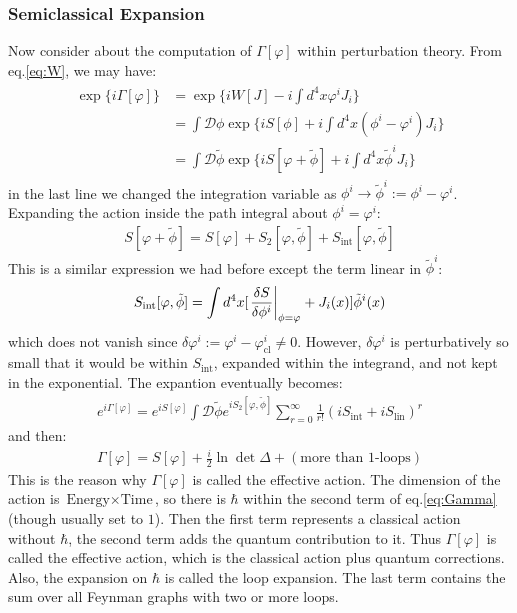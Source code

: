 \subsubsection{Semiclassical Expansion}
Now consider about the computation of $\Gamma[\varphi]$ within perturbation theory. From eq.\ref{eq:W}, we may have:
\begin{align}
    \begin{split}
        \exp \lbrace i\Gamma[\varphi]\rbrace &= \exp \lbrace iW[J] - i\int d^{4}x \varphi^{i} J_{i} \rbrace \\
        &= \int \mathcal{D} \phi \exp \lbrace iS[\phi] + i \int d^{4}x (\phi ^{i} - \varphi ^{i})J_{i} \rbrace \\
        &= \int \mathcal{D} \tilde{\phi} \exp \lbrace iS[\varphi + \tilde{\phi}]+ i\int d^{4}x \tilde{\phi} ^{i} J_{i} \rbrace
    \end{split}
\end{align}
in the last line we changed the integration variable as $\phi ^{i} \rightarrow \tilde{\phi}^{i} := \phi ^{i} - \varphi ^{i}$. Expanding the action inside the path integral about $\phi^{i} = \varphi ^{i}$:
\begin{align}
    S[\varphi + \tilde{\phi}] = S[\varphi] + S_{2} [\varphi, \tilde{\phi}] + S_{\text{int}}[\varphi,\tilde{\phi}]
\end{align}
This is a similar expression we had before except the term linear in $\tilde{\phi}^{i}$:
\begin{align}
    S_{\text{int}}[\varphi,\tilde{\phi}] = \int d^{4}x [\eval{\fdv{S}{\phi^{i}}(x)}_{\phi=\varphi} + J_{i}(x)] \tilde{\phi}^{i}(x)
\end{align}
which does not vanish since $\delta \varphi^{i} := \varphi ^{i} - \varphi_{\text{cl}}^{i} \neq 0$. However, $\delta\varphi^{i}$ is perturbatively so small that it would be within $S_{\text{int}}$, expanded within the integrand, and not kept in the exponential. The expantion eventually becomes:
\begin{align}
    e^{i\Gamma[\varphi]} = e^{iS[\varphi]} \int \mathcal{D}\tilde{\phi} e^{iS_{2}[\varphi,\tilde{\phi}]}\sum _{r=0}^{\infty} \frac{1}{r!}(iS_{\text{int}}+ i S_{\text{lin}})^{r}
\end{align}
and then:
\begin{align}
    \label{eq:Gamma}
    \Gamma[\varphi] = S[\varphi] + \frac{i}{2}\ln \det \Delta + (\text{more than 1-loops})
\end{align}
This is the reason why $\Gamma[\varphi]$ is called the effective action. The dimension of the action is $\text{Energy} \times \text{Time}$, so there is $\hbar$ within the second term of eq.\ref{eq:Gamma} (though usually set to $1$). Then the first term represents a classical action without $\hbar$, the second term adds the quantum contribution to it. Thus $\Gamma[\varphi]$ is called the effective action, which is the classical action plus quantum corrections. Also, the expansion on $\hbar$ is called the loop expansion. The last term contains the sum over all Feynman graphs with two or more loops. \\

